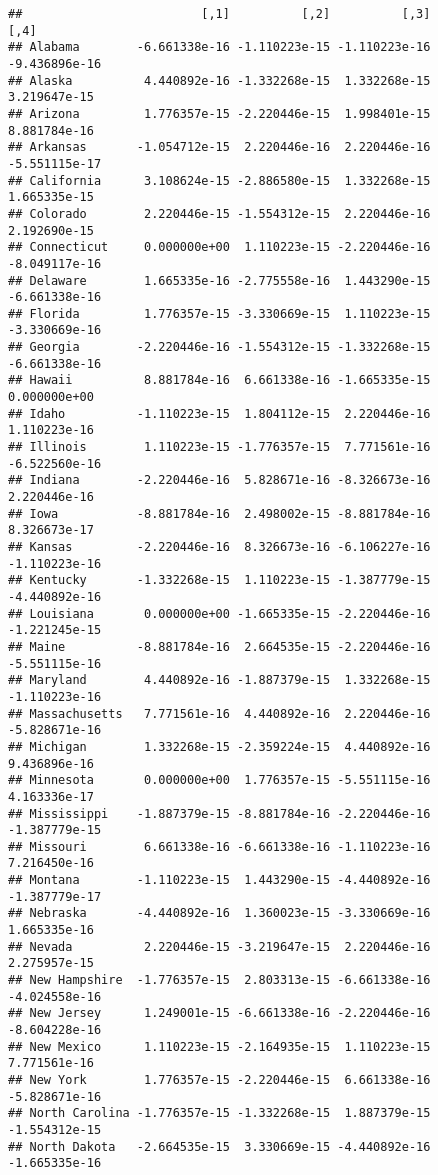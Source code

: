 \documentclass[]{article}
\begin{document}
\begin{verbatim}
##                         [,1]          [,2]          [,3]          [,4]
## Alabama        -6.661338e-16 -1.110223e-15 -1.110223e-16 -9.436896e-16
## Alaska          4.440892e-16 -1.332268e-15  1.332268e-15  3.219647e-15
## Arizona         1.776357e-15 -2.220446e-15  1.998401e-15  8.881784e-16
## Arkansas       -1.054712e-15  2.220446e-16  2.220446e-16 -5.551115e-17
## California      3.108624e-15 -2.886580e-15  1.332268e-15  1.665335e-15
## Colorado        2.220446e-15 -1.554312e-15  2.220446e-16  2.192690e-15
## Connecticut     0.000000e+00  1.110223e-15 -2.220446e-16 -8.049117e-16
## Delaware        1.665335e-16 -2.775558e-16  1.443290e-15 -6.661338e-16
## Florida         1.776357e-15 -3.330669e-15  1.110223e-15 -3.330669e-16
## Georgia        -2.220446e-16 -1.554312e-15 -1.332268e-15 -6.661338e-16
## Hawaii          8.881784e-16  6.661338e-16 -1.665335e-15  0.000000e+00
## Idaho          -1.110223e-15  1.804112e-15  2.220446e-16  1.110223e-16
## Illinois        1.110223e-15 -1.776357e-15  7.771561e-16 -6.522560e-16
## Indiana        -2.220446e-16  5.828671e-16 -8.326673e-16  2.220446e-16
## Iowa           -8.881784e-16  2.498002e-15 -8.881784e-16  8.326673e-17
## Kansas         -2.220446e-16  8.326673e-16 -6.106227e-16 -1.110223e-16
## Kentucky       -1.332268e-15  1.110223e-15 -1.387779e-15 -4.440892e-16
## Louisiana       0.000000e+00 -1.665335e-15 -2.220446e-16 -1.221245e-15
## Maine          -8.881784e-16  2.664535e-15 -2.220446e-16 -5.551115e-16
## Maryland        4.440892e-16 -1.887379e-15  1.332268e-15 -1.110223e-16
## Massachusetts   7.771561e-16  4.440892e-16  2.220446e-16 -5.828671e-16
## Michigan        1.332268e-15 -2.359224e-15  4.440892e-16  9.436896e-16
## Minnesota       0.000000e+00  1.776357e-15 -5.551115e-16  4.163336e-17
## Mississippi    -1.887379e-15 -8.881784e-16 -2.220446e-16 -1.387779e-15
## Missouri        6.661338e-16 -6.661338e-16 -1.110223e-16  7.216450e-16
## Montana        -1.110223e-15  1.443290e-15 -4.440892e-16 -1.387779e-17
## Nebraska       -4.440892e-16  1.360023e-15 -3.330669e-16  1.665335e-16
## Nevada          2.220446e-15 -3.219647e-15  2.220446e-16  2.275957e-15
## New Hampshire  -1.776357e-15  2.803313e-15 -6.661338e-16 -4.024558e-16
## New Jersey      1.249001e-15 -6.661338e-16 -2.220446e-16 -8.604228e-16
## New Mexico      1.110223e-15 -2.164935e-15  1.110223e-15  7.771561e-16
## New York        1.776357e-15 -2.220446e-15  6.661338e-16 -5.828671e-16
## North Carolina -1.776357e-15 -1.332268e-15  1.887379e-15 -1.554312e-15
## North Dakota   -2.664535e-15  3.330669e-15 -4.440892e-16 -1.665335e-16

\end{verbatim}
\end{document}
